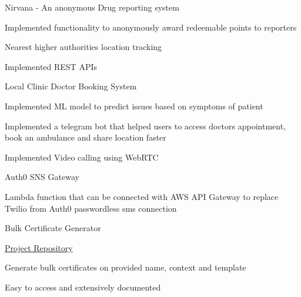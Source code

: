 
\begin{cventries}
  \cventry
    {} 
    {Nirvana - An anonymous Drug reporting system}
    {}
    {} %
    {
      \begin{cvitems} %
		\item {Implemented functionality to anonymously award redeemable points to reporters}
        \item {Nearest higher authorities location tracking}
        \item {Implemented REST APIs}
      \end{cvitems}
    }

  \cventry
    {} %
    {Local Clinic Doctor Booking System} %
    {} %
    {} %
    {
      \begin{cvitems} %
      	\item {Implemented ML model to predict issues based on symptoms of patient}
		\item {Implemented a telegram bot that helped users to access doctors appointment, book an ambulance and share location faster}
        \item {Implemented Video calling using WebRTC}
      \end{cvitems}
    }

    \cventry
    {} %
    {Auth0 SNS Gateway} %
    {} %
    {} %
    {
      \begin{cvitems} %
      	\item {Lambda function that can be connected with AWS API Gateway to replace Twilio from Auth0 passwordless sms connection}
      \end{cvitems}
    }

    \cventry
    {} %
    {Bulk Certificate Generator} %
    {} %
    {} %
    {
      \begin{cvitems} %
      \item {\hyperlink{https://github.com/zameel7/bulk-certificate.git}{Project Repository}}
      	\item {Generate bulk certificates on provided name, context and template}
       \item {Easy to access and extensively documented}
      \end{cvitems}
    }


\end{cventries}
